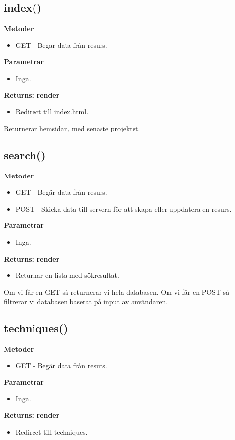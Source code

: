 \documentclass{TDP003mall}
\begin{document}
\subsection{index()}
\textbf{Metoder}
\begin{itemize}
    \item GET - Begär data från resurs.
\end{itemize}
\textbf{Parametrar}
\begin{itemize}
    \item Inga.
\end{itemize}
\textbf{Returns: render}
\begin{itemize}
    \item[] Redirect till index.html.
\end{itemize}
Returnerar hemsidan, med senaste projektet.

\subsection{search()}
\textbf{Metoder}
\begin{itemize}
    \item GET - Begär data från resurs.
    \item POST - Skicka data till servern för att skapa eller uppdatera en resurs.
\end{itemize}
\textbf{Parametrar}
\begin{itemize}
    \item Inga.
\end{itemize}
\textbf{Returns: render}
\begin{itemize}
    \item[] Returnar en lista med sökresultat.
\end{itemize}
Om vi får en GET så returnerar vi hela databasen.
Om vi får en POST så filtrerar vi databasen baserat på input av användaren.

\subsection{techniques()}
\textbf{Metoder}
\begin{itemize}
    \item GET - Begär data från resurs.
\end{itemize}
\textbf{Parametrar}
\begin{itemize}
    \item Inga.
\end{itemize}
\textbf{Returns: render}
\begin{itemize}
    \item[] Redirect till techniques.
\end{itemize}
\end{document}
